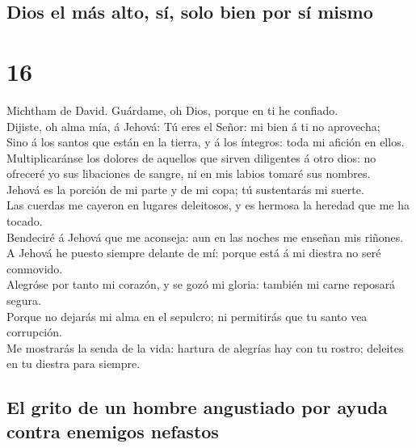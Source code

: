 \hypertarget{dios-el-muxe1s-alto-suxed-solo-bien-por-suxed-mismo}{%
\subsection{Dios el más alto, sí, solo bien por sí
mismo}\label{dios-el-muxe1s-alto-suxed-solo-bien-por-suxed-mismo}}

\hypertarget{section-19-16}{%
\section{16}\label{section-19-16}}

 Michtham de David. Guárdame, oh Dios, porque en ti he
confiado.\\
 Dijiste, oh alma mía, á Jehová: Tú eres el Señor: mi bien
á ti no aprovecha;\\
 Sino á los santos que están en la tierra, y á los
íntegros: toda mi afición en ellos.\\
 Multiplicaránse los dolores de aquellos que sirven
diligentes á otro dios: no ofreceré yo sus libaciones de sangre, ni en
mis labios tomaré sus nombres.\\
 Jehová es la porción de mi parte y de mi copa; tú
sustentarás mi suerte.\\
 Las cuerdas me cayeron en lugares deleitosos, y es
hermosa la heredad que me ha tocado.\\
 Bendeciré á Jehová que me aconseja: aun en las noches me
enseñan mis riñones.\\
 A Jehová he puesto siempre delante de mí: porque está á
mi diestra no seré conmovido.\\
 Alegróse por tanto mi corazón, y se gozó mi gloria:
también mi carne reposará segura.\\
 Porque no dejarás mi alma en el sepulcro; ni permitirás
que tu santo vea corrupción.\\
 Me mostrarás la senda de la vida: hartura de alegrías
hay con tu rostro; deleites en tu diestra para siempre.

\hypertarget{el-grito-de-un-hombre-angustiado-por-ayuda-contra-enemigos-nefastos}{%
\subsection{El grito de un hombre angustiado por ayuda contra enemigos
nefastos}\label{el-grito-de-un-hombre-angustiado-por-ayuda-contra-enemigos-nefastos}}

